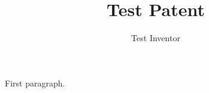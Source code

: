 \documentclass{uspatent}
\begin{document}
\title{Test Patent}
\author{Test Inventor}
\maketitle
\patentParagraph First paragraph.
\end{document}
